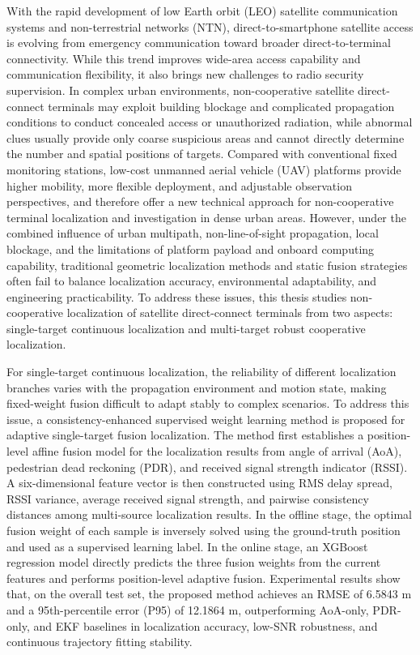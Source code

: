 \begin{enabstract}
With the rapid development of low Earth orbit (LEO) satellite communication systems and non-terrestrial networks (NTN), direct-to-smartphone satellite access is evolving from emergency communication toward broader direct-to-terminal connectivity. While this trend improves wide-area access capability and communication flexibility, it also brings new challenges to radio security supervision. In complex urban environments, non-cooperative satellite direct-connect terminals may exploit building blockage and complicated propagation conditions to conduct concealed access or unauthorized radiation, while abnormal clues usually provide only coarse suspicious areas and cannot directly determine the number and spatial positions of targets. Compared with conventional fixed monitoring stations, low-cost unmanned aerial vehicle (UAV) platforms provide higher mobility, more flexible deployment, and adjustable observation perspectives, and therefore offer a new technical approach for non-cooperative terminal localization and investigation in dense urban areas. However, under the combined influence of urban multipath, non-line-of-sight propagation, local blockage, and the limitations of platform payload and onboard computing capability, traditional geometric localization methods and static fusion strategies often fail to balance localization accuracy, environmental adaptability, and engineering practicability. To address these issues, this thesis studies non-cooperative localization of satellite direct-connect terminals from two aspects: single-target continuous localization and multi-target robust cooperative localization.

For single-target continuous localization, the reliability of different localization branches varies with the propagation environment and motion state, making fixed-weight fusion difficult to adapt stably to complex scenarios. To address this issue, a consistency-enhanced supervised weight learning method is proposed for adaptive single-target fusion localization. The method first establishes a position-level affine fusion model for the localization results from angle of arrival (AoA), pedestrian dead reckoning (PDR), and received signal strength indicator (RSSI). A six-dimensional feature vector is then constructed using RMS delay spread, RSSI variance, average received signal strength, and pairwise consistency distances among multi-source localization results. In the offline stage, the optimal fusion weight of each sample is inversely solved using the ground-truth position and used as a supervised learning label. In the online stage, an XGBoost regression model directly predicts the three fusion weights from the current features and performs position-level adaptive fusion. Experimental results show that, on the overall test set, the proposed method achieves an RMSE of 6.5843 m and a 95th-percentile error (P95) of 12.1864 m, outperforming AoA-only, PDR-only, and EKF baselines in localization accuracy, low-SNR robustness, and continuous trajectory fitting stability.


\end{enabstract}
